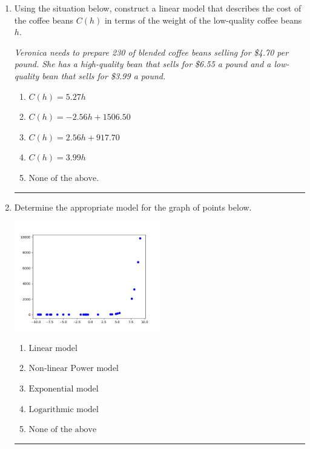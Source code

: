 \documentclass[14pt]{extbook}
\newcommand{\litem}[1]{\item#1\hspace*{-1cm}\rule{\textwidth}{0.4pt}}
\begin{document}
\begin{enumerate}
{\begin{enumerate}[label=\Alph*.]
\end{enumerate} }
\litem{
Using the situation below, construct a linear model that describes the cost of the coffee beans $C(h)$ in terms of the weight of the low-quality coffee beans $h$.
\begin{center}
    \textit{ Veronica needs to prepare 230 of blended coffee beans selling for \$4.70 per pound. She has a high-quality bean that sells for \$6.55 a pound and a low-quality bean that sells for \$3.99 a pound. }
\end{center}
\begin{enumerate}[label=\Alph*.]
\item \( C(h) = 5.27 h \)
\item \( C(h) = -2.56 h + 1506.50 \)
\item \( C(h) = 2.56 h + 917.70 \)
\item \( C(h) = 3.99 h \)
\item \( \text{None of the above.} \)

\end{enumerate} }
\litem{
Determine the appropriate model for the graph of points below.
\begin{center}
    \includegraphics[width=0.5\textwidth]{../Figures/identifyModelGraph12A.png}
\end{center}
\begin{enumerate}[label=\Alph*.]
\item \( \text{Linear model} \)
\item \( \text{Non-linear Power model} \)
\item \( \text{Exponential model} \)
\item \( \text{Logarithmic model} \)
\item \( \text{None of the above} \)

\end{enumerate} }
\end{enumerate}
\end{document}
